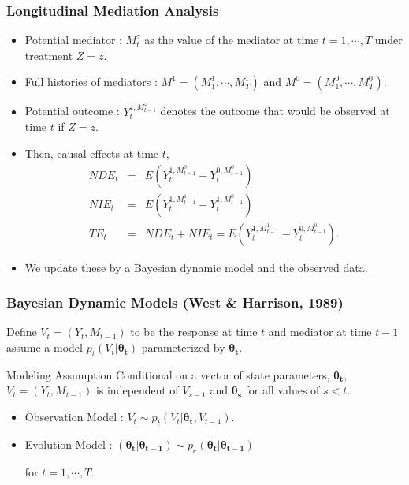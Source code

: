 \documentclass{beamer}
\begin{document}
\begin{frame}
\frametitle{Longitudinal Mediation Analysis}
\begin{itemize}
\item Potential mediator : $M_t^z$
as the value of the mediator at time $t = 1, \cdots, T$
under treatment $Z=z$.
\item Full histories of mediators : $M^1 = (M_1^1,\cdots, M_T^1)$ and $M^0 =
(M_1^0,\cdots, M_T^0)$.
\item Potential outcome : $Y_t^{z,M_{t-1}^z}$
denotes the outcome that would be observed at time $t$ if $Z=z$.
\item Then, causal effects at time $t$, 
\begin{eqnarray*}
NDE_t & = & 
E(Y_t^{1,M^0_{t-1}}- Y_t^{0,M^0_{t-1}} )\\
 NIE_t & = &
E(Y_t^{1,M^1_{t-1}}- Y_t^{1,M^0_{t-1}} )\\
TE_t & = & NDE_t+NIE_t = E(Y_t^{1,M^1_{t-1}}- Y_t^{0,M^0_{t-1}} ).
\end{eqnarray*}
\item We update these by a Bayesian dynamic model and the observed data.
\end{itemize}

\end{frame}

\begin{frame}
\frametitle{Bayesian Dynamic Models (West \& Harrison, 1989)}
Define $V_t=(Y_t, M_{t-1})$ to be the
response at time $t$ and mediator at time $t-1$ assume a model
$p_t(V_t|\boldsymbol{\theta_t})$ parameterized by
$\boldsymbol{\theta_t}$.
\begin{block}{Modeling Assumption}
Conditional on a vector of
  state parameters, $\boldsymbol{\theta_t}$, $V_t=(Y_t,
M_{t-1})$ is independent of $V_{s-1}$ and $\boldsymbol{\theta_s}$
  for all values of $s<t$.
\end{block}
\begin{itemize}
\item Observation Model : $ V_t \sim
p_t(V_t | \boldsymbol{\theta_{t}}, V_{t-1})$.
\item Evolution Model : $(\boldsymbol{\theta_t}|\boldsymbol{\theta_{t-1}}) \sim p_e(\boldsymbol{\theta_t}|\boldsymbol{ \theta_{t-1}})$

for $t=1,\cdots, T.$
\end{itemize}
\end{frame}
\end{document}
